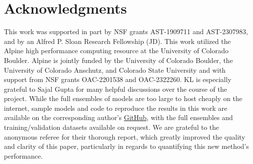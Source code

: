 \documentclass[floatfix,twocolumn,trackchanges,linenumbers]{aastex7}
\begin{document}
\section{Acknowledgments}
This work was supported in part by NSF grants AST-1909711 and AST-2307983, and by an Alfred P. Sloan Research Fellowship (JD). This work utilized the Alpine high performance computing resource at the University of Colorado Boulder. Alpine is jointly funded by the University of Colorado Boulder, the University of Colorado Anschutz, and Colorado State University and with support from NSF grants OAC-2201538 and OAC-2322260. KL is especially grateful to Sajal Gupta for many helpful discussions over the course of the project. While the full ensembles of models are too large to host cheaply on the internet, sample models and code to reproduce the results in this work are available on the corresponding author's \href{https://github.com/kirklong/DCNN}{GitHub}, with the full ensembles and training/validation datasets available on request.
We are grateful to the anonymous referee for their thorough report, which greatly improved the quality and clarity of this paper, particularly in regards to quantifying this new method's performance.


\newpage

{}


\appendix 
\label{appendix}
\vspace{-6mm} 
\end{document}
